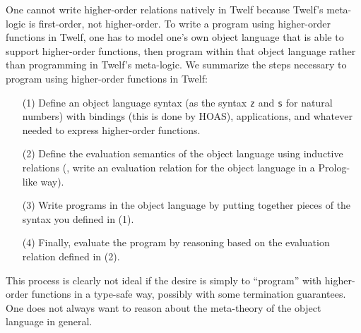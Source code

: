 One cannot write higher-order relations natively in Twelf
because Twelf's meta-logic is first-order, not higher-order.
To write a program using higher-order functions in Twelf, one has to model
one's own object language that is able to support higher-order functions,
then program within that object language rather than programming in
Twelf's meta-logic. We summarize the steps necessary to program
using higher-order functions in Twelf:
\begin{itemize}
\item[(1)] Define an object language syntax
        (as the syntax \texttt{z} and \texttt{s} for natural numbers)
        with bindings (this is done by HOAS), applications, and whatever
        needed to express higher-order functions.
\item[(2)] Define the evaluation semantics of the object language using
        inductive relations (\ie, write an evaluation relation for
        the object language in a Prolog-like way).
\item[(3)] Write programs in the object language by putting
        together pieces of the syntax you defined in (1).
\item[(4)] Finally, evaluate the program by reasoning based on
        the evaluation relation defined in (2).
\end{itemize}
This process is clearly not ideal if the desire is simply to ``program''
with higher-order functions in a type-safe way, possibly with some
termination guarantees. One does not always want to reason about
the meta-theory of the object language in general.

